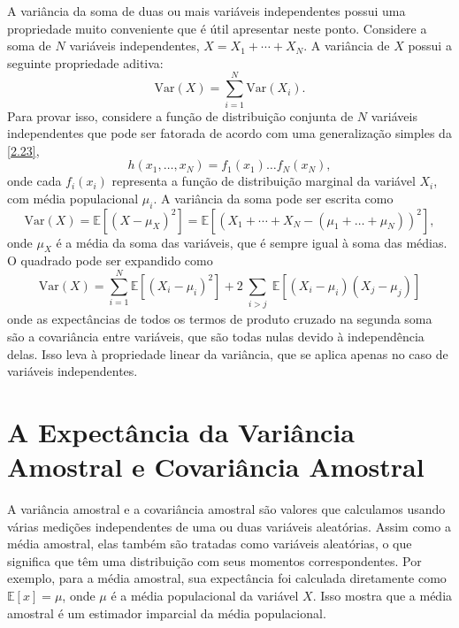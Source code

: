 A variância da soma de duas ou mais variáveis independentes possui uma propriedade muito conveniente que é útil apresentar neste ponto. Considere a soma de $N$ variáveis independentes, $X = X_1 + \cdots + X_N$. A variância de $X$ possui a seguinte propriedade aditiva:
\begin{equation*}
\text{Var}(X) = \sum_{i=1}^{N} \text{Var}(X_i).
\end{equation*}
Para provar isso, considere a função de distribuição conjunta de $N$ variáveis independentes que pode ser fatorada de acordo com uma generalização simples da \autoref{2.23},
\begin{equation*}
h(x_1, \ldots, x_N) = f_1(x_1) \ldots f_N(x_N),
\end{equation*}
onde cada $f_i(x_i)$ representa a função de distribuição marginal da variável $X_i$, com média populacional $\mu_i$. A variância da soma pode ser escrita como
\begin{equation*}
\text{Var}(X) = \mathbb{E}[(X - \mu_X)^2] = \mathbb{E}[(X_1 + \cdots + X_N - (\mu_1 + \ldots + \mu_N))^2],
\end{equation*}
onde $\mu_X$ é a média da soma das variáveis, que é sempre igual à soma das médias. O quadrado pode ser expandido como
\begin{equation*}
\text{Var}(X) = \sum_{i=1}^{N} \mathbb{E}[(X_i - \mu_i)^2] + 2 \sum_{\substack{i > j}} \mathbb{E}[(X_i - \mu_i)(X_j - \mu_j)]
\end{equation*}
onde as expectâncias de todos os termos de produto cruzado na segunda soma são a covariância entre variáveis, que são todas nulas devido à independência delas. Isso leva à propriedade linear da variância, que se aplica apenas no caso de variáveis independentes.

\section{A Expectância da Variância Amostral e Covariância Amostral}\label{sec:2-6}

A variância amostral e a covariância amostral são valores que calculamos usando várias medições independentes de uma ou duas variáveis aleatórias. Assim como a média amostral, elas também são tratadas como variáveis aleatórias, o que significa que têm uma distribuição com seus momentos correspondentes. Por exemplo, para a média amostral, sua expectância foi calculada diretamente como $\mathbb{E}[x] = \mu$, onde $\mu$ é a média populacional da variável $X$. Isso mostra que a média amostral é um estimador imparcial da média populacional.

